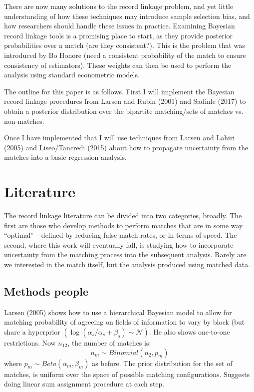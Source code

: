 \documentclass[11pt,reqno]{amsart}
\begin{document}
There are now many solutions to the record linkage problem, and yet little understanding of how these techniques may introduce sample selection bias, and how researchers should handle these issues in practice.  Examining Bayesian record linkage tools is a promising place to start, as they provide posterior probabilities over a match (are they consistent?).  This is the problem that was introduced by Bo Honore (need a consistent probability of the match to ensure consistency of estimators).  These weights can then be used to perform the analysis using standard econometric models. 

The outline for this paper is as follows.  First I will implement the Bayesian record linkage procedures from Larsen and Rubin (2001) and Sadinle (2017) to obtain a posterior distribution over the bipartite matching/sets of matches vs. non-matches.

Once I have implemented that I will use techniques from Larsen and Lahiri (2005) and Liseo/Tancredi (2015) about how to propagate uncertainty from the matches into a basic regression analysis.   

\section{Literature}

The record linkage literature can be divided into two categories, broadly.  The first are those who develop methods to perform matches that are in some way ``optimal" -- defined by reducing false match rates, or in terms of speed.  The second, where this work will eventually fall, is studying how to incorporate uncertainty from the matching process into the subsequent analysis.  Rarely are we interested in the match itself, but the analysis produced using matched data.  
\subsection{Methods people}
Larsen (2005) shows how to use a hierarchical Bayesian model to allow for matching probability of agreeing on fields of information to vary by block (but share a hyperprior $(\log(\alpha_s/\alpha_s+\beta_s) \sim \mathcal{N})$.  He also shows one-to-one restrictions.  Now $n_{12}$, the number of matches is:
\[ n_{m} \sim Binomial(n_2, p_m) \] 
where $p_m \sim Beta(\alpha_m, \beta_m)$ as before. The prior distribution for the set of matches, is uniform over the space of possible matching configurations. Suggests doing linear sum assignment procedure at each step.  %
\end{document}
